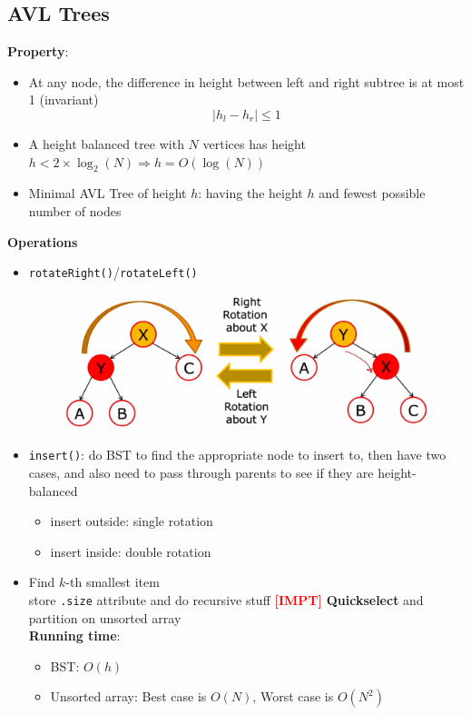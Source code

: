 \documentclass{article}
\newcommand{\impt}[0]{\textcolor{red}{\textbf{[IMPT] }}}
\begin{document}
\begin{multicols}{2}
\subsection{AVL Trees}
\textbf{Property}:
\begin{itemize}
	\item At any node, the difference in height between left and right subtree is at most 1 (invariant)
	$$|h_l -h_r| \leq 1$$
	\item A height balanced tree with $N$ vertices has height $h < 2 \times \log_2(N) \Rightarrow h = O(\log(N))$
	\item Minimal AVL Tree of height $h$: having the height $h$ and fewest possible number of nodes
\end{itemize}
\vspace{0.5em}
\textbf{Operations}
\begin{itemize}
	\item \texttt{rotateRight()}/\texttt{rotateLeft()}
	\begin{figure}[H]
		\centering
		\includegraphics[width=\columnwidth]{image/avl_tree.png}
	\end{figure}
    \item \texttt{insert()}: do BST to find the appropriate node to insert to, then have two cases, and also need to pass through parents to see if they are height-balanced
    \begin{itemize}
    	\item insert outside: single rotation
    	\item insert inside: double rotation
    \end{itemize}
    \item Find $k$-th smallest item\\
    store \texttt{.size} attribute and do recursive stuff \impt \textbf{Quickselect} and partition on unsorted array\\
    \textbf{Running time}:
    \begin{itemize}
    	\item BST: $O(h)$
    	\item Unsorted array: Best case is $O(N)$, Worst case is $O(N^2)$
    \end{itemize}
\end{itemize}

\end{multicols}
\end{document}
